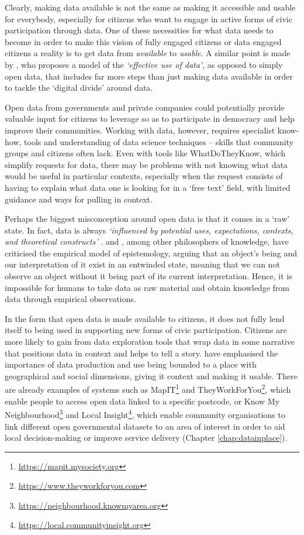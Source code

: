 Clearly, making data available is not the same as making it accessible and usable for everybody, especially for citizens who want to engage in active forms of civic participation through data. One of these necessities for what data needs to become in order to make this vision of fully engaged citizens or data engaged citizens a reality is to get data from \textit{available} to \textit{usable}. A similar point is made by \citet{gurstein_open_2011}, who proposes a model of the \textit{`effective use of data'}, as opposed to simply open data, that includes far more steps than just making data available in order to tackle the `digital divide' around data.

Open data from governments and private companies could potentially provide valuable input for citizens to leverage so as to participate in democracy and help improve their communities. Working with data, however, requires specialist know-how, tools and understanding of data science techniques -- skills that community groups and citizens often lack. Even with tools like WhatDoTheyKnow, which simplify requests for data, there may be problems with not knowing what data would be useful in particular contexts, especially when the request consists of having to explain what data one is looking for in a `free text' field, with limited guidance and ways for pulling in context. 

Perhaps the biggest misconception around open data is that it comes in a `raw' state. In fact, data is always \textit{`influenced by potential uses, expectations, contexts, and theoretical constructs'} \citep{tuomi_data_1999}. \citet{heidegger_what_1976} and \citet{polanyi_tacit_2009}, among other philosophers of knowledge, have criticised the empirical model of epistemology, arguing that an object's being and our interpretation of it exist in an entwinded state, meaning that we can not observe an object without it being part of its current interpretation. Hence, it is impossible for humans to take data as raw material and obtain knowledge from data through empirical observations. 

In the form that open data is made available to citizens, it does not fully lend itself to being used in supporting new forms of civic participation. Citizens are more likely to gain from data exploration tools that wrap data in some narrative that positions data in context and helps to tell a story. \cite{taylor_data--place:_2015} have emphasised the importance of data production and use being bounded to a place with geographical and social dimensions, giving it context and making it usable. There are already examples of systems such as MapIT\footnote{\url{https://mapit.mysociety.org}} and TheyWorkForYou\footnote{\url{https://www.theyworkforyou.com}}, which enable people to access open data linked to a specific postcode, or Know My Neighbourhood\footnote{\url{https://neighbourhood.knowmyarea.org}} and Local Insight\footnote{\url{https://local.communityinsight.org}}, which enable community organisations to link different open governmental datasets to an area of interest in order to aid local decision-making or improve service delivery (Chapter \ref{chap:datainplace}).
\newline

